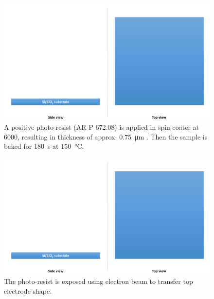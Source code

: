\begin{multicols}{2}[]
    
    \begin{figure}[H]
        \centering
        \includegraphics[width=0.375\paperwidth, page=15]{img/04/Manufacturing_under.pdf}
        \caption{A positive photo-resist (AR-P 672.08) is applied in spin-coater at \SI{6000}{\rpm}, resulting in thickness of approx. \SI{0.75}{\micro\meter} . Then the sample is baked for \SI{180}{\second} at \SI{150}{\celsius}.}
        \label{FabricationTopResist}
    \end{figure}
    
    \begin{figure}[H]
        \centering
        \includegraphics[width=0.375\paperwidth, page=16]{img/04/Manufacturing_under.pdf}
        \caption{The photo-resist is exposed using electron beam to transfer top electrode shape.}
        \label{FabricationTopExposure}
    \end{figure}
    
\end{multicols}
